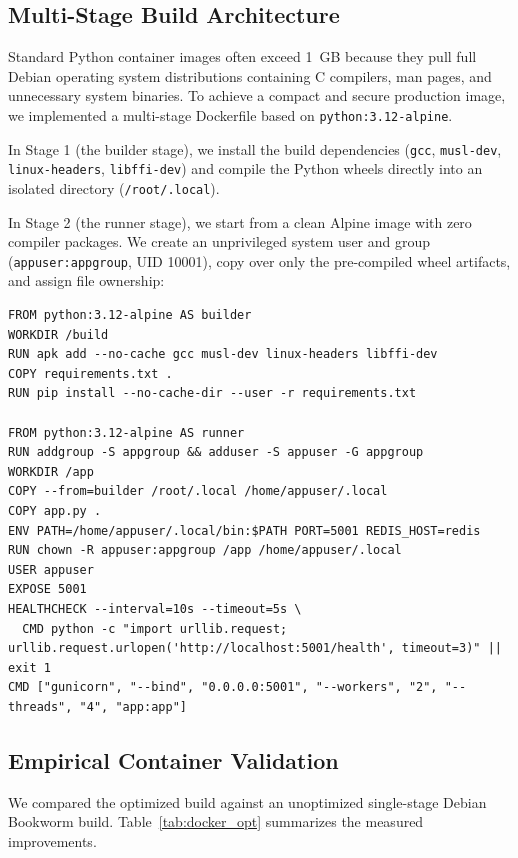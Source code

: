 \documentclass[conference]{IEEEtran}
\begin{document}
\subsection{Multi-Stage Build Architecture}
Standard Python container images often exceed 1~GB because they pull full Debian operating system distributions containing C compilers, man pages, and unnecessary system binaries. To achieve a compact and secure production image, we implemented a multi-stage Dockerfile based on \texttt{python:3.12-alpine}.

In Stage 1 (the builder stage), we install the build dependencies (\texttt{gcc}, \texttt{musl-dev}, \texttt{linux-headers}, \texttt{libffi-dev}) and compile the Python wheels directly into an isolated directory (\texttt{/root/.local}).

In Stage 2 (the runner stage), we start from a clean Alpine image with zero compiler packages. We create an unprivileged system user and group (\texttt{appuser:appgroup}, UID 10001), copy over only the pre-compiled wheel artifacts, and assign file ownership:

\begin{lstlisting}[style=ieeecode,caption={Production Multi-Stage Dockerfile}]
FROM python:3.12-alpine AS builder
WORKDIR /build
RUN apk add --no-cache gcc musl-dev linux-headers libffi-dev
COPY requirements.txt .
RUN pip install --no-cache-dir --user -r requirements.txt

FROM python:3.12-alpine AS runner
RUN addgroup -S appgroup && adduser -S appuser -G appgroup
WORKDIR /app
COPY --from=builder /root/.local /home/appuser/.local
COPY app.py .
ENV PATH=/home/appuser/.local/bin:$PATH PORT=5001 REDIS_HOST=redis
RUN chown -R appuser:appgroup /app /home/appuser/.local
USER appuser
EXPOSE 5001
HEALTHCHECK --interval=10s --timeout=5s \
  CMD python -c "import urllib.request; urllib.request.urlopen('http://localhost:5001/health', timeout=3)" || exit 1
CMD ["gunicorn", "--bind", "0.0.0.0:5001", "--workers", "2", "--threads", "4", "app:app"]
\end{lstlisting}

\subsection{Empirical Container Validation}
We compared the optimized build against an unoptimized single-stage Debian Bookworm build. Table~\ref{tab:docker_opt} summarizes the measured improvements.
\end{document}
